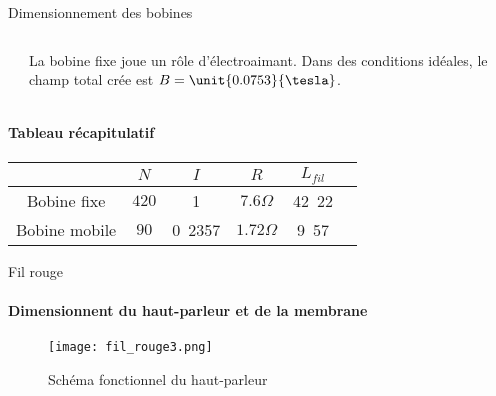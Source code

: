 \documentclass[pdf]{beamer}
\begin{document}
\begin{frame}{Dimensionnement des bobines}

	\begin{columns}
		\begin{column}{5cm}
		\end{column}

		\begin{column}{5cm}
			La bobine fixe joue un rôle d'électroaimant. Dans des conditions idéales, le champ total crée est $B = \unit{0.0753}{\tesla}$.
		\end{column}
	\end{columns}

	\bigbreak

	\paragraph{\textbf{Tableau récapitulatif}}
	\small
	{
		\begin{center}
		\begin{tabular}{c|c|c|c|c|c}
										& $N$ 	& $I$ 										& $R$ 							& $L_{fil}$ \\
			\hline
			Bobine fixe 	& $420$ & \unit{1}{\ampere} 			& $7.6\Omega$ 			& \unit{42.22}{\meter} \\
			\hline
			Bobine mobile & $90$ & \unit{0.2357}{\ampere}  & $1.72\Omega$ 	 		& \unit{9.57}{\meter} \\
		\end{tabular}
		\end{center}
	}
\end{frame}

\begin{frame}{Fil rouge}
\framesubtitle{Dimensionnent du haut-parleur et de la membrane}
\begin{figure}[ht!]
    \centering
    \texttt{[image: fil\_rouge3.png]}
    \caption{Schéma fonctionnel du haut-parleur}
    \label{schema_fonctionnel}
\end{figure}
\end{frame}
\end{document}
